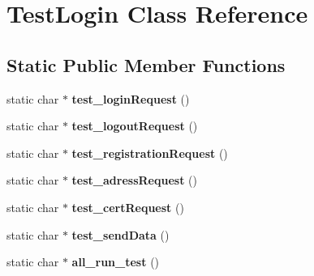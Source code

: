 \hypertarget{class_test_login}{\section{Test\-Login Class Reference}
\label{class_test_login}
}
\subsection*{Static Public Member Functions}
\begin{DoxyCompactItemize}
\item 
\hypertarget{class_test_login_aa1298153b31df790cfceb75b9d3b800b}{static char $\ast$ {\bfseries test\-\_\-login\-Request} ()}\label{class_test_login_aa1298153b31df790cfceb75b9d3b800b}

\item 
\hypertarget{class_test_login_a3df248e83b48a75fd145327f07723a13}{static char $\ast$ {\bfseries test\-\_\-logout\-Request} ()}\label{class_test_login_a3df248e83b48a75fd145327f07723a13}

\item 
\hypertarget{class_test_login_a1f1b2f4373b428f9723682d634e2b0a9}{static char $\ast$ {\bfseries test\-\_\-registration\-Request} ()}\label{class_test_login_a1f1b2f4373b428f9723682d634e2b0a9}

\item 
\hypertarget{class_test_login_ab361b169f351356ef4326d604268b806}{static char $\ast$ {\bfseries test\-\_\-adress\-Request} ()}\label{class_test_login_ab361b169f351356ef4326d604268b806}

\item 
\hypertarget{class_test_login_ad0933b7bf4fcdd902d20b51b33044b6b}{static char $\ast$ {\bfseries test\-\_\-cert\-Request} ()}\label{class_test_login_ad0933b7bf4fcdd902d20b51b33044b6b}

\item 
\hypertarget{class_test_login_ae2ec015d109af443264513049e15cc46}{static char $\ast$ {\bfseries test\-\_\-send\-Data} ()}\label{class_test_login_ae2ec015d109af443264513049e15cc46}

\item 
\hypertarget{class_test_login_a27d4591e2ba7e714b074985be1a8190a}{static char $\ast$ {\bfseries all\-\_\-run\-\_\-test} ()}\label{class_test_login_a27d4591e2ba7e714b074985be1a8190a}

\end{DoxyCompactItemize}

